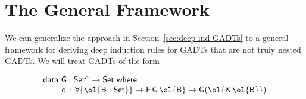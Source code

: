 \documentclass[sigplan,screen]{acmart}
\begin{document}
\vspace*{-0.05in}

\section{The General Framework}\label{sec:framework}

We can generalize the approach in Section~\ref{sec:deep-ind-GADTs} to
a general framework for deriving deep induction rules for GADTs that
are not truly nested GADTs. We will treat GADTs of the form

\vspace*{-0.05in}

\begin{equation}\label{eq:gadts}
\begin{array}{l}
  \mathsf{data\ G : Set^\alpha
    \to Set\ where}\\
\mathsf{\;\;\;\;\;\;\;\;c\, :\, \forall \{\ol{B : Set}\} \to F\,G\,\ol{B} \to G (\ol{K\,\ol{B}})}
\end{array}
\end{equation}
\end{document}

